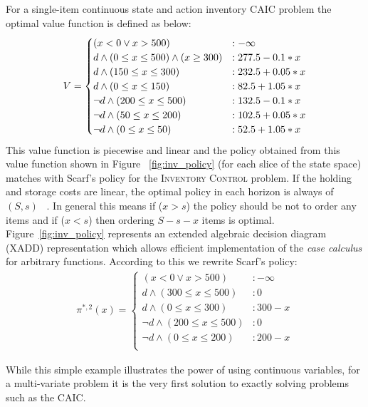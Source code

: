\documentclass[twoside,11pt]{article}
\newcommand{\InventoryControl}{\textsc{Inventory Control }}
\begin{document}
For a single-item continuous state and action inventory CAIC problem the optimal value function is defined as below:
\vspace{-3mm}
\begin{align}
V = \begin{cases}
(x < 0 \vee x>500) &: -\infty \\
d \land (0 \leq x \leq 500) \land (x \geq 300) &:  277.5 - 0.1 * x \\
d \land (150 \leq x \leq 300) &:  232.5 + 0.05 * x \\
d \land ( 0 \leq x \leq 150) &:  82.5 + 1.05 * x \\
\neg d \land (200 \leq x \leq 500)  &:  132.5 - 0.1 * x \\
\neg d \land (50 \leq x \leq 200) &: 102.5 + 0.05 * x \\
\neg d \land (0 \leq x \leq 50) &:  52.5 + 1.05 * x \\
\end{cases} \label{eq:vfun_inv}
\vspace{-7mm}
\end{align}
This value function is piecewise and linear and the policy obtained from this value function shown in Figure ~\ref{fig:inv_policy} (for each slice of the state space) matches with Scarf's policy for the \InventoryControl problem. If the holding and storage costs are linear, the optimal policy in each horizon is always of $(S,s)$ ~\cite{Scarf_Karlin58}. In general this means if ($x>s$) the policy should be not to order any items and if ($x<s$) then ordering $S-s-x$ items is optimal. Figure~\ref{fig:inv_policy} represents an extended algebraic decision diagram (XADD) representation which allows efficient implementation of the \emph{case calculus} for arbitrary functions. 
According to this we rewrite Scarf's policy: 
\begin{align}
\pi^{*,2}(x) = 
\begin{cases}
(x < 0 \vee x>500) &: -\infty \\
d \land (300 \leq x \leq 500)  &:  0 \\
d \land (0 \leq x \leq 300) &:  300 - x \\
\neg d \land (200 \leq x \leq 500) &:  0 \\
\neg d \land (0 \leq x \leq 200) &:  200 - x \\
\end{cases}
\end{align}

While this simple example illustrates the power of using continuous variables, for a multi-variate problem it is the very first solution to exactly solving problems such as the CAIC. 
\end{document}
